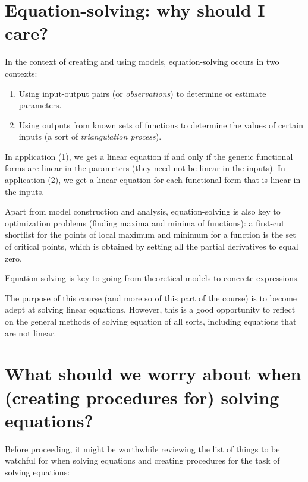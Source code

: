 \documentclass[10pt]{amsart}
\begin{document}
\section{Equation-solving: why should I care?}

In the context of creating and using models, equation-solving occurs
in two contexts:

\begin{enumerate}
\item Using input-output pairs (or {\em observations}) to determine or
  estimate parameters.
\item Using outputs from known sets of functions to determine the
  values of certain inputs (a sort of {\em triangulation process}).
\end{enumerate}

In application (1), we get a linear equation if and only if the
generic functional forms are linear in the parameters (they need not
be linear in the inputs). In application (2), we get a linear equation
for each functional form that is linear in the inputs.

Apart from model construction and analysis, equation-solving is also
key to optimization problems (finding maxima and minima of functions):
a first-cut shortlist for the points of local maximum and minimum for
a function is the set of critical points, which is obtained by setting
all the partial derivatives to equal zero.

Equation-solving is key to going from theoretical models to concrete
expressions.

The purpose of this course (and more so of this part of the course) is
to become adept at solving linear equations. However, this is a good
opportunity to reflect on the general methods of solving equation of
all sorts, including equations that are not linear.

\section{What should we worry about when (creating procedures for) solving equations?}

Before proceeding, it might be worthwhile reviewing the list of things
to be watchful for when solving equations and creating procedures for
the task of solving equations:
\end{document}
